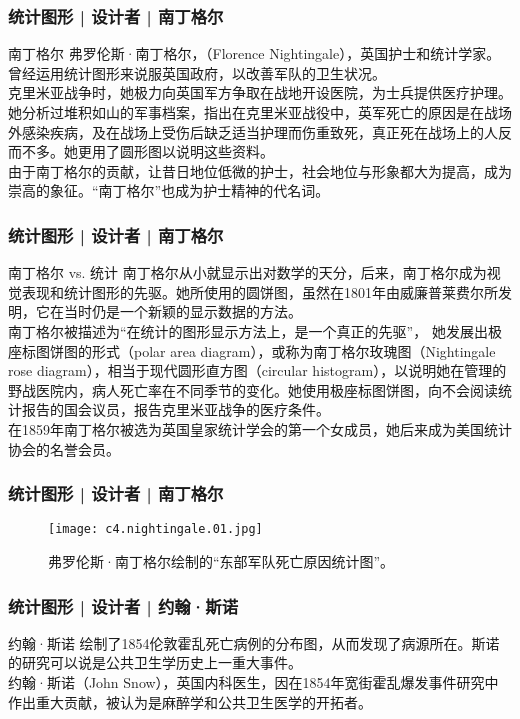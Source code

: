 \begin{frame}
  \frametitle{统计图形 | 设计者 | 南丁格尔}
  \begin{block}{南丁格尔}
    弗罗伦斯·南丁格尔，（Florence Nightingale），英国护士和统计学家。曾经运用统计图形来说服英国政府，以改善军队的卫生状况。\\
    \vspace{0.5em}
克里米亚战争时，她极力向英国军方争取在战地开设医院，为士兵提供医疗护理。她分析过堆积如山的军事档案，指出在克里米亚战役中，英军死亡的原因是在战场外感染疾病，及在战场上受伤后缺乏适当护理而伤重致死，真正死在战场上的人反而不多。她更用了圆形图以说明这些资料。\\
    \vspace{0.5em}
由于南丁格尔的贡献，让昔日地位低微的护士，社会地位与形象都大为提高，成为崇高的象征。“南丁格尔”也成为护士精神的代名词。
  \end{block}
\end{frame}

\begin{frame}
  \frametitle{统计图形 | 设计者 | 南丁格尔}
  \begin{block}{南丁格尔 vs. 统计}
南丁格尔从小就显示出对数学的天分，后来，南丁格尔成为视觉表现和统计图形的先驱。她所使用的圆饼图，虽然在1801年由威廉普莱费尔所发明，它在当时仍是一个新颖的显示数据的方法。\\
\vspace{0.5em}
南丁格尔被描述为“在统计的图形显示方法上，是一个真正的先驱”， 她发展出极座标图饼图的形式（polar area diagram），或称为南丁格尔玫瑰图（Nightingale rose diagram），相当于现代圆形直方图（circular histogram），以说明她在管理的野战医院内，病人死亡率在不同季节的变化。她使用极座标图饼图，向不会阅读统计报告的国会议员，报告克里米亚战争的医疗条件。\\
\vspace{0.5em}
在1859年南丁格尔被选为英国皇家统计学会的第一个女成员，她后来成为美国统计协会的名誉会员。
  \end{block}
\end{frame}

\begin{frame}
  \frametitle{统计图形 | 设计者 | 南丁格尔}
  \begin{figure}
    \centering
    \texttt{[image: c4.nightingale.01.jpg]}
    \caption{弗罗伦斯·南丁格尔绘制的“东部军队死亡原因统计图”。}
  \end{figure}
\end{frame}

\begin{frame}
  \frametitle{统计图形 | 设计者 | 约翰·斯诺}
  \begin{block}{约翰·斯诺}
    绘制了1854伦敦霍乱死亡病例的分布图，从而发现了病源所在。斯诺的研究可以说是公共卫生学历史上一重大事件。\\
    \vspace{0.5em}
    约翰·斯诺（John Snow），英国内科医生，因在1854年宽街霍乱爆发事件研究中作出重大贡献，被认为是麻醉学和公共卫生医学的开拓者。\\
  \end{block}
\end{frame}

